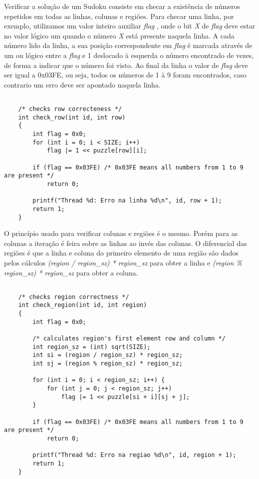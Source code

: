 \documentclass[a4paper, 12pt]{article}
\begin{document}
Verificar a solução de um Sudoku consiste em checar a existência de números
repetidos em todas as linhas, colunas e regiões. Para checar uma linha,
por exemplo, utilizamos um valor inteiro auxiliar \textit{flag} , onde o bit
\textit{X} de \textit{flag} deve estar no valor lógico um quando o número \textit{X}
está presente naquela linha.
A cada número lido da linha, a sua posição correspondente em \textit{flag} é
marcada através de um ou lógico entre a \textit{flag} e 1 deslocado à esquerda
o número encontrado de vezes, de forma a indicar que o número foi visto.
Ao final da linha o valor de \textit{flag} deve ser igual a 0x03FE, ou seja,
 todos os números de 1 à 9 foram encontrados, caso contrario um erro deve ser
apontado naquela linha.

\begin{verbatim}

    /* checks row correcteness */
    int check_row(int id, int row)
    {
        int flag = 0x0;
        for (int i = 0; i < SIZE; i++)
            flag |= 1 << puzzle[row][i];

        if (flag == 0x03FE) /* 0x03FE means all numbers from 1 to 9 are present */
            return 0;

        printf("Thread %d: Erro na linha %d\n", id, row + 1);
        return 1;
    }

\end{verbatim}


O princípio usado para verificar colunas e regiões é o mesmo. Porém para as
colunas a iteração é feira sobre as linhas ao invés das colunas. O diferencial
das regiões é que a linha e coluna do primeiro elemento de uma região são dados
pelos cálculos \textit{(region / region\_sz) * region\_sz} para obter a linha e
\textit{(region \% region\_sz) * region\_sz} para obter a coluna.

\begin{verbatim}

    /* checks region correctness */
    int check_region(int id, int region)
    {
        int flag = 0x0;

        /* calculates region's first element row and column */
        int region_sz = (int) sqrt(SIZE);
        int si = (region / region_sz) * region_sz;
        int sj = (region % region_sz) * region_sz;

        for (int i = 0; i < region_sz; i++) {
            for (int j = 0; j < region_sz; j++)
                flag |= 1 << puzzle[si + i][sj + j];
        }

        if (flag == 0x03FE) /* 0x03FE means all numbers from 1 to 9 are present */
            return 0;

        printf("Thread %d: Erro na regiao %d\n", id, region + 1);
        return 1;
    }

\end{verbatim}
\end{document}
